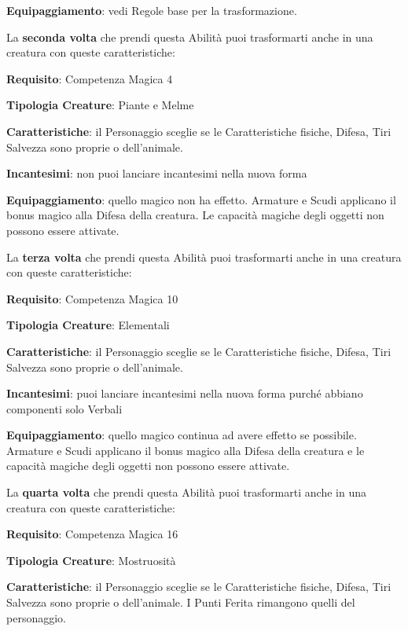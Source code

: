 \begin{multicols}{2}
\textbf{Equipaggiamento}: vedi Regole base per la trasformazione.

\medskip

La \textbf{seconda volta} che prendi questa Abilità puoi trasformarti anche in una creatura con queste caratteristiche:

\medskip

\textbf{Requisito}: Competenza Magica 4

\textbf{Tipologia Creature}: Piante e Melme

\textbf{Caratteristiche}: il Personaggio sceglie se le Caratteristiche fisiche, Difesa, Tiri Salvezza sono proprie o dell'animale.

\textbf{Incantesimi}: non puoi lanciare incantesimi nella nuova forma

\textbf{Equipaggiamento}: quello magico non ha effetto. Armature e Scudi applicano il bonus magico alla Difesa della creatura. Le capacità magiche degli oggetti non possono essere attivate.

\medskip

La \textbf{terza volta} che prendi questa Abilità puoi trasformarti anche in una creatura con queste caratteristiche:

\medskip

\textbf{Requisito}: Competenza Magica 10

\textbf{Tipologia Creature}: Elementali

\textbf{Caratteristiche}: il Personaggio sceglie se le Caratteristiche fisiche, Difesa, Tiri Salvezza sono proprie o dell'animale.

\textbf{Incantesimi}: puoi lanciare incantesimi nella nuova forma purché abbiano componenti solo Verbali

\textbf{Equipaggiamento}: quello magico continua ad avere effetto se possibile. Armature e Scudi applicano il bonus magico alla Difesa della creatura e le capacità magiche degli oggetti non possono essere attivate.

\medskip

La \textbf{quarta volta} che prendi questa Abilità puoi trasformarti anche in una creatura con queste caratteristiche:

\medskip

\textbf{Requisito}: Competenza Magica 16

\textbf{Tipologia Creature}: Mostruosità

\textbf{Caratteristiche}: il Personaggio sceglie se le Caratteristiche fisiche, Difesa, Tiri Salvezza sono proprie o dell'animale. I Punti Ferita rimangono quelli del personaggio.


\end{multicols}
